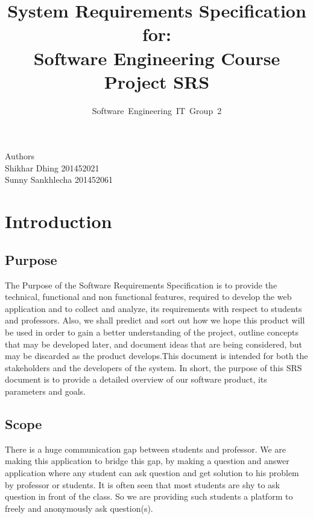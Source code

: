 \documentclass[journal,12pt,onecolumn,draftclsnofoot,]{IEEEtran}
\begin{document}
\title{System Requirements Specification for:\\ Software Engineering Course Project SRS}

\author{Software~Engineering~IT~Group~2}

\maketitle
\IEEEpeerreviewmaketitle



Authors \\ Shikhar Dhing 201452021 \\ Sunny Sankhlecha 201452061 \\





\tableofcontents

\section{Introduction}

\subsection{Purpose}
The Purpose of the Software Requirements Specification is to provide the technical, functional and non functional features, required to develop the web application and to collect and analyze, its requirements with respect to students and professors. Also, we shall predict and sort out how we hope this product will be used in order to gain a better understanding of the project, outline concepts that may be developed later, and document ideas that are being considered, but may be discarded as the product develops.This document is intended for both the stakeholders and the developers of the system. In short, the
purpose of this SRS document is to provide a detailed overview of our software product, its parameters
and goals.

\subsection{Scope}
There is a huge communication gap between students and professor. We are making this application to bridge this gap, by making a question and answer application where any student can ask question and get solution to his problem by professor or students. It is often seen that most students are shy to ask question in front of the class. So we are providing such students a platform to freely and anonymously ask question(s).
\end{document}
